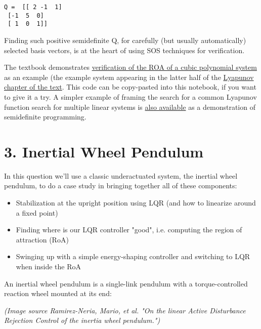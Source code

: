 \documentclass[11pt]{article}
\providecommand{\tightlist}{%
      \setlength{\itemsep}{0pt}\setlength{\parskip}{0pt}}
\begin{document}
    \begin{Verbatim}[commandchars=\\\{\}]
Q =  [[ 2 -1  1]
 [-1  5  0]
 [ 1  0  1]]

    \end{Verbatim}

    Finding such positive semidefinite Q, for carefully (but usually
automatically) selected basis vectors, is at the heart of using SOS
techniques for verification.

The textbook demonstrates
\href{https://github.com/RussTedrake/underactuated/blob/master/src/lyapunov/cubic_polynomial.py}{verification
of the ROA of a cubic polynomial system} as an example (the example
system appearing in the latter half of the
\href{http://underactuated.csail.mit.edu/underactuated.html?chapter=lyapunov}{Lyapunov
chapter of the text}. This code can be copy-pasted into this notebook,
if you want to give it a try. A simpler example of framing the search
for a common Lyapunov function search for multiple linear systems is
\href{https://github.com/RussTedrake/underactuated/blob/master/src/lyapunov/linear_systems_common_lyapunov.py}{also
available} as a demonstration of semidefinite programming.

    \section{3. Inertial Wheel Pendulum}\label{inertial-wheel-pendulum}

In this question we'll use a classic underactuated system, the inertial
wheel pendulum, to do a case study in bringing together all of these
components:

\begin{itemize}
\tightlist
\item
  Stabilization at the upright position using LQR (and how to linearize
  around a fixed point)
\item
  Finding where is our LQR controller "good", i.e. computing the region
  of attraction (RoA)
\item
  Swinging up with a simple energy-shaping controller and switching to
  LQR when inside the RoA
\end{itemize}

An inertial wheel pendulum is a single-link pendulum with a
torque-controlled reaction wheel mounted at its end:

\emph{(Image source Ramirez-Neria, Mario, et al. "On the linear Active
Disturbance Rejection Control of the inertia wheel pendulum.")}
\end{document}
